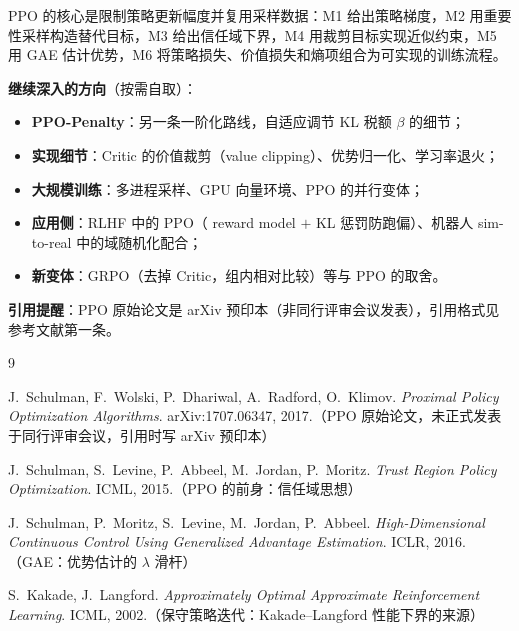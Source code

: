 \documentclass[UTF8,12pt,a4paper]{ctexrep}
\newcommand{\pin}[1]{\begin{pinbox}#1\end{pinbox}}
\begin{document}
\pin{PPO 的核心是限制策略更新幅度并复用采样数据：M1 给出策略梯度，M2 用重要性采样构造替代目标，M3 给出信任域下界，M4 用裁剪目标实现近似约束，M5 用 GAE 估计优势，M6 将策略损失、价值损失和熵项组合为可实现的训练流程。}

\textbf{继续深入的方向}（按需自取）：

\begin{itemize}[nosep]
  \item \textbf{PPO-Penalty}：另一条一阶化路线，自适应调节 KL 税额 $\beta$ 的细节；
  \item \textbf{实现细节}：Critic 的价值裁剪（value clipping）、优势归一化、学习率退火；
  \item \textbf{大规模训练}：多进程采样、GPU 向量环境、PPO 的并行变体；
  \item \textbf{应用侧}：RLHF 中的 PPO（ reward model $+$ KL 惩罚防跑偏）、机器人 sim-to-real 中的域随机化配合；
  \item \textbf{新变体}：GRPO（去掉 Critic，组内相对比较）等与 PPO 的取舍。
\end{itemize}

\textbf{引用提醒}：PPO 原始论文是 arXiv 预印本（非同行评审会议发表），引用格式见参考文献第一条。

\begin{thebibliography}{9}

J.~Schulman, F.~Wolski, P.~Dhariwal, A.~Radford, O.~Klimov.
\textit{Proximal Policy Optimization Algorithms}.
arXiv:1707.06347, 2017.（PPO 原始论文，未正式发表于同行评审会议，引用时写 arXiv 预印本）

J.~Schulman, S.~Levine, P.~Abbeel, M.~Jordan, P.~Moritz.
\textit{Trust Region Policy Optimization}.
ICML, 2015.（PPO 的前身：信任域思想）

J.~Schulman, P.~Moritz, S.~Levine, M.~Jordan, P.~Abbeel.
\textit{High-Dimensional Continuous Control Using Generalized Advantage Estimation}.
ICLR, 2016.（GAE：优势估计的 $\lambda$ 滑杆）

S.~Kakade, J.~Langford.
\textit{Approximately Optimal Approximate Reinforcement Learning}.
ICML, 2002.（保守策略迭代：Kakade--Langford 性能下界的来源）

\end{thebibliography}
\end{document}
